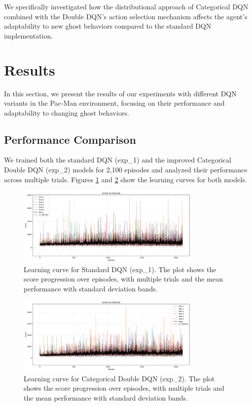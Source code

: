 \documentclass{article} %
\begin{document}
We specifically investigated how the distributional approach of Categorical DQN combined with the Double DQN's action selection mechanism affects the agent's adaptability to new ghost behaviors compared to the standard DQN implementation.

\section{Results}

In this section, we present the results of our experiments with different DQN variants in the Pac-Man environment, focusing on their performance and adaptability to changing ghost behaviors.

\subsection{Performance Comparison}

We trained both the standard DQN (exp\_1) and the improved Categorical Double DQN (exp\_2) models for 2,100 episodes and analyzed their performance across multiple trials. Figures \ref{fig:standard_dqn} and \ref{fig:cat_double_dqn} show the learning curves for both models.

\begin{figure}[h]
  \centering
  \includegraphics[width=0.8\textwidth]{../exp_1/images/score_analysis.png}
  \caption{Learning curve for Standard DQN (exp\_1). The plot shows the score progression over episodes, with multiple trials and the mean performance with standard deviation bands.}
  \label{fig:standard_dqn}
\end{figure}

\begin{figure}[h]
  \centering
  \includegraphics[width=0.8\textwidth]{../exp_2/images/score_analysis.png}
  \caption{Learning curve for Categorical Double DQN (exp\_2). The plot shows the score progression over episodes, with multiple trials and the mean performance with standard deviation bands.}
  \label{fig:cat_double_dqn}
\end{figure}
\end{document}
